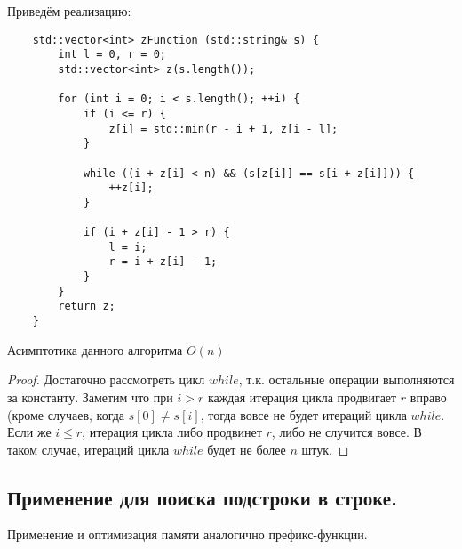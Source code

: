 Приведём реализацию:

\begin{lstlisting}
	std::vector<int> zFunction (std::string& s) {
		int l = 0, r = 0;
		std::vector<int> z(s.length());

		for (int i = 0; i < s.length(); ++i) {
			if (i <= r) {
				z[i] = std::min(r - i + 1, z[i - l];
			}
			
			while ((i + z[i] < n) && (s[z[i]] == s[i + z[i]])) {
				++z[i];
			}

			if (i + z[i] - 1 > r) {
				l = i;
				r = i + z[i] - 1;
			}
		}
		return z;
	}
\end{lstlisting}

\begin{remark}
	Асимптотика данного алгоритма $O(n)$
\end{remark}

\begin{proof}
	Достаточно рассмотреть цикл $while$, т.к. остальные операции выполняются за константу. Заметим что при
	$i > r$ каждая итерация цикла продвигает $r$ вправо (кроме случаев, когда $s[0] \neq s[i]$, тогда
	вовсе не будет итераций цикла $while$. Если же $i \leq r$, итерация цикла либо продвинет $r$, либо
	не случится вовсе. В таком случае, итераций цикла $while$ будет не более $n$ штук.
\end{proof}

\subsection{Применение для поиска подстроки в строке.}

Применение и оптимизация памяти аналогично префикс-функции.
